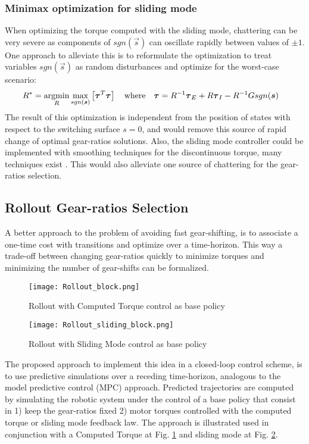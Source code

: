 \subsubsection{Minimax optimization for sliding mode}

When optimizing the torque computed with the sliding mode, chattering can be very severe as components of $sgn( \vec{s} )$ can oscillate rapidly between values of $\pm1$. One approach to alleviate this is to reformulate the optimization to treat variables $sgn( \vec{s} )$ as random disturbances and optimize for the worst-case scenario:
%
\begin{align}
R^{*} &= \operatornamewithlimits{argmin}\limits_{R} \operatornamewithlimits{max}\limits_{sgn(\vec{s})} \left[ \vec{\tau}^T\vec{\tau}  \right] \quad\text{where}\quad \vec{\tau} = R^{-1} \vec{\tau}_{E} + R \vec{\tau}_{I} - R^{-1} G sgn( \vec{s} ) 
\end{align} 
%
The result of this optimization is independent from the position of states with respect to the switching surface $s=0$, and would remove this source of rapid change of optimal gear-ratios solutions. Also, the sliding mode controller could be implemented with smoothing techniques for the discontinuous torque, many techniques exist \cite{slotine_applied_1991} \cite{perruquetti_sliding_2002}. This would also alleviate one source of chattering for the gear-ratios selection.

\subsection{Rollout Gear-ratios Selection}

A better approach to the problem of avoiding fast gear-shifting, is to associate a one-time cost with transitions and optimize over a time-horizon. This way a trade-off between changing gear-ratios quickly to minimize torques and minimizing the number of gear-shifts can be formalized.
%
\begin{figure}[tp]
	\centering
		\texttt{[image: Rollout\_block.png]}
	\caption{Rollout with Computed Torque control as base policy}
	\label{fig:Rollout_block}
\end{figure}
%
\begin{figure}[tp]
	\centering
		\texttt{[image: Rollout\_sliding\_block.png]}
	\caption{Rollout with Sliding Mode control as base policy}
	\label{fig:Rollout_sliding_block}
\end{figure}
%
The proposed approach to implement this idea in a closed-loop control scheme, is to use predictive simulations over a receding time-horizon, analogous to the model predictive control (MPC) approach. Predicted trajectories are computed by simulating the robotic system under the control of a base policy that consist in 1) keep the gear-ratios fixed 2) motor torques controlled with the computed torque or sliding mode feedback law.  The approach is illustrated used in conjunction with a Computed Torque at Fig. \ref{fig:Rollout_block} and sliding mode at Fig. \ref{fig:Rollout_sliding_block}.

